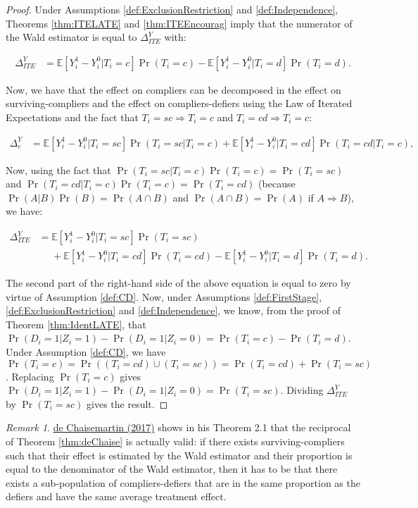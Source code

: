 \documentclass[
]{book}
\newcommand{\esp}[1]{\mathbb{E}[ #1 ]}
\theoremstyle{definition}
\theoremstyle{definition}
\theoremstyle{definition}
\theoremstyle{definition}
\theoremstyle{remark}
\newtheorem*{remark}{Remark}
\begin{document}
\begin{proof}
\iffalse{} {Proof. } \fi{}Under Assumptions \ref{def:ExclusionRestriction} and \ref{def:Independence}, Theorems \ref{thm:ITELATE} and \ref{thm:ITEEncourag} imply that the numerator of the Wald estimator is equal to \(\Delta^Y_{ITE}\) with:

\begin{align*}
  \Delta^Y_{ITE}  & = \esp{Y_i^{1}-Y_i^{0}|T_i=c}\Pr(T_i=c)-\esp{Y_i^{1}-Y_i^{0}|T_i=d}\Pr(T_i=d).
\end{align*}

Now, we have that the effect on compliers can be decomposed in the effect on surviving-compliers and the effect on compliers-defiers using the Law of Iterated Expectations and the fact that \(T_i=sc \Rightarrow T_i=c\) and \(T_i=cd \Rightarrow T_i=c\):

\begin{align*}
\Delta^Y_{c} & = \esp{Y_i^{1}-Y_i^{0}|T_i=sc}\Pr(T_i=sc|T_i=c)+\esp{Y_i^{1}-Y_i^{0}|T_i=cd}\Pr(T_i=cd|T_i=c),
\end{align*}

Now, using the fact that \(\Pr(T_i=sc|T_i=c)\Pr(T_i=c)=\Pr(T_i=sc)\) and \(\Pr(T_i=cd|T_i=c)\Pr(T_i=c)=\Pr(T_i=cd)\) (because \(\Pr(A|B)\Pr(B)=\Pr(A\cap B)\) and \(\Pr(A\cap B)=\Pr(A)\) if \(A \Rightarrow B\)), we have:

\begin{align*}
  \Delta^Y_{ITE} & = \esp{Y_i^{1}-Y_i^{0}|T_i=sc}\Pr(T_i=sc)\\
                & \phantom{=}+\esp{Y_i^{1}-Y_i^{0}|T_i=cd}\Pr(T_i=cd)-\esp{Y_i^{1}-Y_i^{0}|T_i=d}\Pr(T_i=d).
\end{align*}

The second part of the right-hand side of the above equation is equal to zero by virtue of Assumption \ref{def:CD}.
Now, under Assumptions \ref{def:FirstStage}, \ref{def:ExclusionRestriction} and \ref{def:Independence}, we know, from the proof of Theorem \ref{thm:IdentLATE}, that \(\Pr(D_i=1|Z_i=1)-\Pr(D_i=1|Z_i=0)=\Pr(T_i=c)-\Pr(T_i=d)\).
Under Assumption \ref{def:CD}, we have \(\Pr(T_i=c)=\Pr((T_i=cd)\cup(T_i=sc))=\Pr(T_i=cd)+\Pr(T_i=sc)\).
Replacing \(\Pr(T_i=c)\) gives \(\Pr(D_i=1|Z_i=1)-\Pr(D_i=1|Z_i=0)=\Pr(T_i=sc)\).
Dividing \(\Delta^Y_{ITE}\) by \(\Pr(T_i=sc)\) gives the result.
\end{proof}

\begin{remark}
\iffalse{} {Remark. } \fi{}\href{https://drive.google.com/file/d/16XWlDECIvreM7l_NHe-JkXgyuPhFT1QG/view}{de Chaisemartin (2017)} shows in his Theorem 2.1 that the reciprocal of Theorem \ref{thm:deChaise} is actually valid: if there exists surviving-compliers such that their effect is estimated by the Wald estimator and their proportion is equal to the denominator of the Wald estimator, then it has to be that there exists a sub-population of compliers-defiers that are in the same proportion as the defiers and have the same average treatment effect.
\end{remark}
\end{document}
